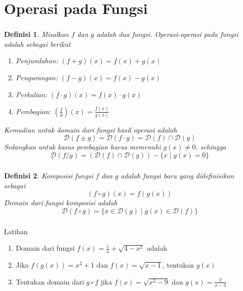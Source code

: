 \documentclass[aspectratio=169]{beamer}
\newtheorem{definisi}{Definisi}
\theoremstyle{definition}
\newcommand{\dom}{\mathcal{D}}
\begin{document}
\section{Operasi pada Fungsi}
\begin{frame}
    \frametitle{\insertsection}
    \begin{definisi}
        Misalkan $f$ dan $g$ adalah dua fungsi. Operasi-operasi pada fungsi adalah sebagai berikut
        \begin{enumerate}[label=(\arabic*)]
            \item Penjumlahan: $(f+g)(x)=f(x)+g(x)$
            \item Pengurangan: $(f-g)(x)=f(x)-g(x)$
            \item Perkalian: $(f\cdot g)(x)=f(x)\cdot g(x)$
            \item Pembagian: $\left(\displaystyle\frac{f}{g}\right)(x)=\displaystyle\frac{f(x)}{g(x)}$
        \end{enumerate}
        Kemudian untuk domain dari fungsi hasil operasi adalah \[\dom(f\pm g)=\dom(f\cdot g)=\dom(f)\cap\dom(g)\]
        Sedangkan untuk kasus pembagian harus memenuhi $g(x)\ne 0$, sehingga
        \[\dom\left(f/g\right)=(\dom(f)\cap\dom(g)) - \{x\mid g(x)=0\}\]
    \end{definisi}
\end{frame}

\begin{frame}
    \frametitle{\insertsection}
    \begin{definisi}
        Komposisi fungsi $f$ dan $g$ adalah fungsi baru yang didefinisikan sebagai
        \[(f\circ g)(x)=f(g(x))\]
        Domain dari fungsi komposisi adalah
        \[\dom(f\circ g)=\{x\in\dom(g)\mid g(x)\in\dom(f)\}\]
    \end{definisi}
\end{frame}

\begin{frame}
    \frametitle{\insertsection}
    \begin{exampleblock}{Latihan}
        \begin{enumerate} [label=(\arabic*)]
            \item Domain dari fungsi $\displaystyle f(x)=\frac{1}{x}+\sqrt{4-x^2}$ adalah
            \item Jika $f(g(x))=x^2+1$ dan $f(x)=\sqrt{x-1}$, tentukan $g(x)$
            \item Tentukan domain dari $g\circ f$ jika $f(x)=\sqrt{x^2-9}$ dan $\displaystyle g(x)=\frac{2}{x-3}$
        \end{enumerate}
    \end{exampleblock}
\end{frame}
\end{document}

